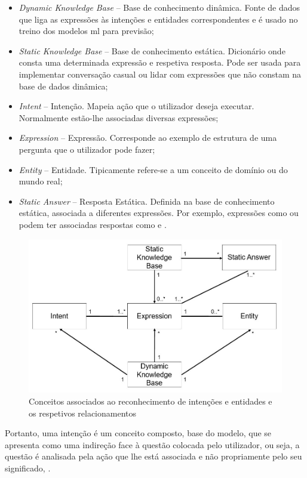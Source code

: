 \begin{itemize}
    \item
    {
        \textit{Dynamic Knowledge Base} -- Base de conhecimento dinâmica. Fonte de dados que liga as expressões às intenções e entidades correspondentes e é usado no treino dos modelos \gls{ml} para previsão;
    }
    \item
    {
        \textit{Static Knowledge Base} -- Base de conhecimento estática. Dicionário onde consta uma determinada expressão e respetiva resposta. Pode ser usada para implementar conversação casual ou lidar com expressões que não constam na base de dados dinâmica;
    }
    \item
    {
        \textit{Intent} -- Intenção. Mapeia ação que o utilizador deseja executar. Normalmente estão-lhe associadas diversas expressões;
    }
    \item
    {
        \textit{Expression} -- Expressão. Corresponde ao exemplo de estrutura de uma pergunta que o utilizador pode fazer;
    }
    \item
    {
        \textit{Entity} -- Entidade. Tipicamente refere-se a um conceito de domínio ou do mundo real;
    }
    \item
    {
        \textit{Static Answer} -- Resposta Estática. Definida na base de conhecimento estática, associada a diferentes expressões. Por exemplo, expressões como  ou  podem ter associadas respostas como  e .
    }
\end{itemize}
%
\begin{figure}
    \centering
    \includegraphics[width=.75\textwidth]{ch04/assets/domain-model.jpg}
    \caption{Conceitos associados ao reconhecimento de intenções e entidades e os respetivos relacionamentos}
    \label{fig:domain_model}
\end{figure}
%
Portanto, uma intenção é um conceito composto, base do modelo, que se apresenta como uma indireção face à questão colocada pelo utilizador, ou seja, a questão é analisada pela ação que lhe está associada e não propriamente pelo seu significado, .

